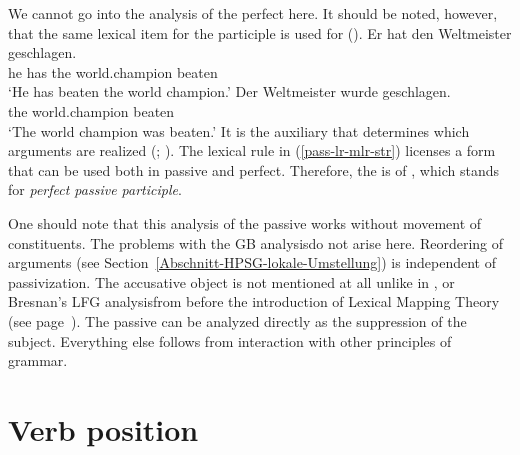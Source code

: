 We cannot go into the analysis of the perfect here. It should be noted, however, that the same lexical
item for the participle is
used for ().
\eal
\ex 
\gll Er hat den Weltmeister geschlagen.\\
     he has the world.champion beaten\\
\glt `He has beaten the world champion.'
\ex 
\gll Der Weltmeister wurde geschlagen.\\
     the world.champion \AUX{} beaten\\
\glt `The world champion was beaten.'
\zl
It is the auxiliary that determines which arguments are realized (\citealp{Haider86}; \citealp[Chapter~17]{MuellerLehrbuch1}).
The lexical rule in (\ref{pass-lr-mlr-str}) licenses a form that can be used both in passive and perfect. Therefore, the
\vformv is of , which stands for \emph{perfect passive participle}.

One should note that this analysis of the passive works without movement of constituents. The problems with the GB analysis\indexgb do not arise here.
Reordering of arguments (see Section~\ref{Abschnitt-HPSG-lokale-Umstellung}) is independent of passivization. The accusative object is not mentioned
at all unlike in \gpsg, \cg or Bresnan's LFG analysis\indexlfg from before the introduction of
Lexical Mapping Theory (see page~\pageref{page-LMT}). The passive can be analyzed directly as the suppression of the subject. Everything else follows from interaction with other principles of grammar.
%
%

\section{Verb position}
\label{Abschnitt-Verbstellung-HPSG}

